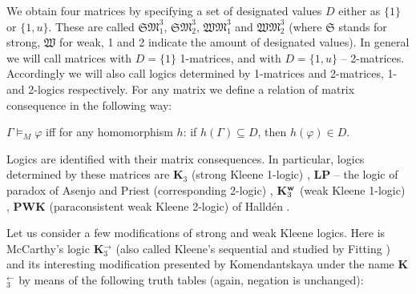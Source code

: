 \documentclass[10pt,a4paper]{article}
\theoremstyle{definition}
\newcommand{\3}{\vspace{.3in}}
\newcommand{\2}{\vspace{.2in}}
\newcommand{\1}{\vspace{.1in}}
\newcommand{\5}{\vspace{.05in}}
\begin{document}
We obtain four matrices by specifying a set of designated values $D$ either as $\{ 1 \}$ or $\{1, u \}$. 
These are called $\mathfrak{SM}_1^3$, $\mathfrak{SM}_2^3$, $\mathfrak{WM}_1^3$ and $\mathfrak{WM}_2^3$ (where $\mathfrak{S}$ stands for strong, $\mathfrak{W}$ for weak, 1 and 2 indicate the amount of designated values). In general we will call matrices with $D = \{ 1 \}$ 1-matrices, and with $D= \{1, u \}$ -- 2-matrices. Accordingly we will also call logics determined by 1-matrices and 2-matrices, 1- and 2-logics respectively.
For any matrix we define a relation of matrix consequence in the following way:

\1

$\Gamma \models_M\varphi $ iff for any homomorphism $h$:
if $h(\Gamma)\subseteq D$, then $h(\varphi)\in D$. 

\1

Logics are identified with their matrix consequences. In particular,
logics determined by these matrices are {\bf K$_3$} (strong Kleene 1-logic) \cite{Kleene}, {\bf LP} -- the logic of paradox of Asenjo and Priest (corresponding 2-logic) \cite{Asenjo,Priest}, {\bf K}$_3^{\bf w}$ (weak Kleene 1-logic) \cite{Kleene}, {\bf PWK} (paraconsistent weak Kleene 2-logic) of Halld\'{e}n \cite{Hallden}. 

Let us consider a few modifications of strong and weak Kleene logics. Here is McCarthy's logic {\bf K$_3^\rightarrow$} \cite{McCarty} (also called Kleene's sequential and studied by Fitting \cite{Fitting94})  
and its interesting modification presented by Ko\-men\-dant\-skaya \cite{Komendantskaya} under the name  {\bf K$_3^\leftarrow$} by means of the following truth tables (again, negation is unchanged):
\end{document}
